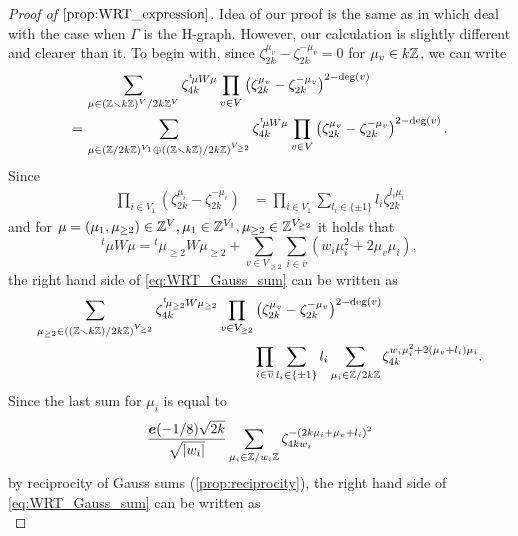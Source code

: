 \documentclass[11pt,a4paper,lualatex]{amsart}
\numberwithin{equation}{section} %
\begin{document}
\begin{proof}[Proof of $ \cref{prop:WRT_expression} $]
	Idea of our proof is the same as in \cite[Proposition 6.1]{MM} which deal with the case when $ \Gamma $ is the H-graph.
	However, our calculation is slightly different and clearer than it.
	To begin with, since $ \zeta_{2k}^{\mu_v} - \zeta_{2k}^{-\mu_v} = 0 $ for $ \mu_v \in k\mathbb{Z} $, we can write
	\begin{equation} \label{eq:WRT_Gauss_sum} 
		\begin{aligned}
			&\sum_{\mu \in (\mathbb{Z} \smallsetminus k\mathbb{Z})^V/2k\mathbb{Z}^V} \zeta_{4k}^{{}^t\!\mu W \mu}
			\prod_{v \in V} \left( \zeta_{2k}^{\mu_v} - \zeta_{2k}^{-\mu_v} \right)^{2-\deg(v)} \\
			= \,
			&\sum_{\mu \in (\mathbb{Z}/ 2k \mathbb{Z})^{V_1} \oplus \left( (\mathbb{Z} \smallsetminus k\mathbb{Z}) / 2k\mathbb{Z} \right)^{V_{ \ge 2 }}} 
			\zeta_{4k}^{{}^t\!\mu W \mu}
			\prod_{v \in V} \left( \zeta_{2k}^{\mu_v} - \zeta_{2k}^{-\mu_v} \right)^{2-\deg(v)}.
		\end{aligned}
	\end{equation}
	Since
	\begin{align}
		\prod_{i \in V_1} \left( \zeta_{2k}^{\mu_i} - \zeta_{2k}^{-\mu_i} \right)
		&= 
		\prod_{i \in V_1} \sum_{l_i \in \{ \pm 1 \} } l_i \zeta_{2k}^{l_i \mu_i}
	\end{align}
	and for $ \mu = (\mu_1, \mu_{\ge 2}) \in \mathbb{Z}^{V}, \mu_1 \in \mathbb{Z}^{V_1}, \mu_{\ge 2} \in \mathbb{Z}^{V_{\ge 2}} $ it holds that
	\[
	{}^t\!\mu W \mu
	= {}^t\!\mu_{\ge 2} W \mu_{\ge 2} + \sum_{v \in V_{\ge 2}} \sum_{i \in \overline{v}} \left( w_i \mu_i^2 + 2 \mu_v \mu_i \right),
	\]
	the right hand side of \cref{eq:WRT_Gauss_sum} can be written as
	\begin{align}
		\sum_{\mu_{\ge 2} \in \left( (\mathbb{Z} \smallsetminus k\mathbb{Z}) / 2k\mathbb{Z} \right)^{V_{ \ge 2 }}} 
		\zeta_{4k}^{{}^t\!\mu_{\ge 2} W \mu_{\ge 2}}
		\prod_{v \in V_{\ge 2}}
		&\left( \zeta_{2k}^{\mu_v} - \zeta_{2k}^{-\mu_v} \right)^{2-\deg(v)}
		\\
		&\prod_{i \in \overline{v}} \sum_{l_i \in \{ \pm 1 \} } l_i
		\sum_{\mu_i \in \mathbb{Z}/ 2k \mathbb{Z}}
		\zeta_{4k}^{w_i \mu_i^2 + 2 (\mu_v + l_i) \mu_i}.
	\end{align}
	Since the last sum for $ \mu_i $ is equal to
	\[	
	\frac{\bm{e}(-1/8) \sqrt{2k}}{\sqrt{\left\lvert w_i\right\rvert}}
	\sum_{\mu_i \in \mathbb{Z}/ w_i \mathbb{Z}}
	\zeta_{4k w_i}^{ -\left( 2k \mu_i + \mu_v + l_i \right)^2 }
	\]
	by reciprocity of Gauss sums (\cref{prop:reciprocity}), the right hand side of \cref{eq:WRT_Gauss_sum} can be written as
	\begin{equation} \label{eq:WRT_Gauss_sum2}

\end{equation}
\end{proof}
\end{document}
